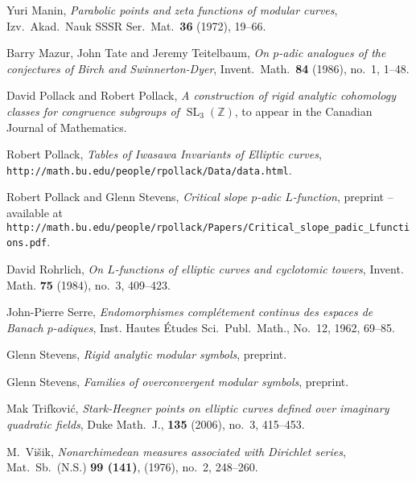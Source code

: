 \documentclass{amsart}
\theoremstyle{plain}
\theoremstyle{definition}
\newcommand{\Z}{{\mathbb Z}}
\DeclareMathOperator{\SL}{SL}
\begin{document}
\begin{thebibliography}{99}
Yuri Manin, \emph{Parabolic points and zeta functions of modular curves},  Izv.\ Akad.\ Nauk SSSR Ser.\ Mat.\ {\bf 36} (1972), 19--66.

Barry Mazur, John Tate and Jeremy Teitelbaum, 
\emph{On $p$-adic analogues of the conjectures of Birch and Swinnerton-Dyer}, Invent.\ Math.\ {\bf 84} (1986), 
no.~1, 1--48.

David Pollack and Robert Pollack,
\emph{A construction of rigid analytic cohomology classes for congruence subgroups of $\SL_3(\Z)$},  to appear in the Canadian Journal of Mathematics.

Robert Pollack, \emph{Tables of Iwasawa Invariants of Elliptic curves}, \\ {\tt http://math.bu.edu/people/rpollack/Data/data.html}. 

Robert Pollack and Glenn Stevens, \emph{Critical slope $p$-adic $L$-function}, preprint -- available at {\tt http://math.bu.edu/people/rpollack/Papers/Critical\_slope\_padic\_Lfunctions.pdf}.

David Rohrlich, \emph{On $L$-functions of elliptic curves and cyclotomic towers}, Invent. Math. {\bf 75} (1984), no.~3, 409--423.

John-Pierre Serre,
{\it Endomorphismes compl\'etement continus des espaces de Banach  $p$-adiques}, 
Inst. Hautes \'Etudes Sci.\ Publ.\ Math., No.~12, 1962, 69--85. 

 Glenn Stevens, \emph{Rigid analytic modular symbols}, preprint.

Glenn Stevens, \emph{Families of overconvergent modular symbols}, preprint.

Mak Trifkovi\'c, \emph{Stark-Heegner points on elliptic curves defined over imaginary quadratic fields},  Duke Math.\ J.,  {\bf 135}  (2006),  no.\ 3, 415--453.

M.\ Vi\v sik, \emph{Nonarchimedean measures associated with Dirichlet series},  Mat.\ Sb.\ (N.S.) {\bf 99 (141)}, (1976), no.~2, 248--260.

\end{thebibliography}
\end{document}
